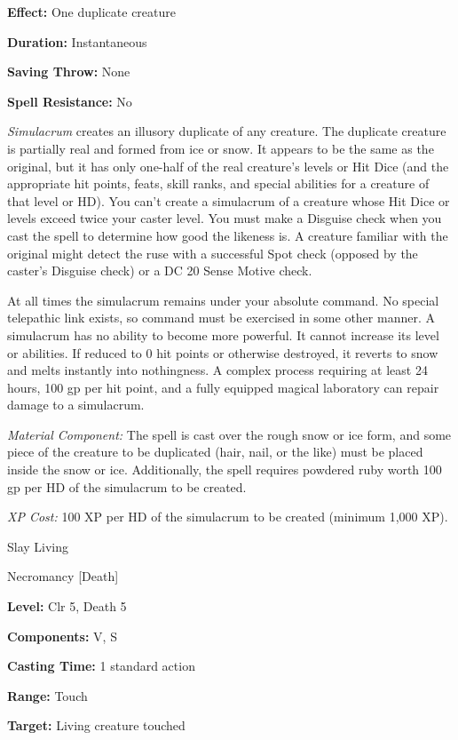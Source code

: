 \documentclass{article}
\begin{document}
\textbf{Effect:} One duplicate creature

\textbf{Duration:} Instantaneous

\textbf{Saving Throw:} None

\textbf{Spell Resistance:} No

\textit{Simulacrum }creates an illusory duplicate of any creature. The duplicate 
creature is partially real and formed from ice or snow. It appears to be the same 
as the original, but it has only one-half of the real creature's levels or Hit 
Dice (and the appropriate hit points, feats, skill ranks, and special abilities 
for a creature of that level or HD). You can't create a simulacrum of a creature 
whose Hit Dice or levels exceed twice your caster level. You must make a Disguise 
check when you cast the spell to determine how good the likeness is. A creature 
familiar with the original might detect the ruse with a successful Spot check (opposed 
by the caster's Disguise check) or a DC 20 Sense Motive check.

At all times the simulacrum remains under your absolute command. No special telepathic 
link exists, so command must be exercised in some other manner. A simulacrum has 
no ability to become more powerful. It cannot increase its level or abilities. 
If reduced to 0 hit points or otherwise destroyed, it reverts to snow and melts 
instantly into nothingness. A complex process requiring at least 24 hours, 100 
gp per hit point, and a fully equipped magical laboratory can repair damage to 
a simulacrum.

\textit{Material Component: }The spell is cast over the rough snow or ice form, 
and some piece of the creature to be duplicated (hair, nail, or the like) must 
be placed inside the snow or ice. Additionally, the spell requires powdered ruby 
worth 100 gp per HD of the simulacrum to be created.

\textit{XP Cost: }100 XP per HD of the simulacrum to be created (minimum 1,000 
XP).

\vspace{12pt}
Slay Living

Necromancy [Death]

\textbf{Level:} Clr 5, Death 5

\textbf{Components:} V, S

\textbf{Casting Time:} 1 standard action

\textbf{Range:} Touch

\textbf{Target:} Living creature touched
\end{document}
